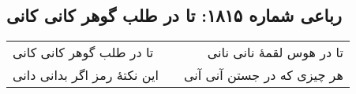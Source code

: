 \begin{center}
\section*{رباعی شماره ۱۸۱۵: تا در طلب گوهر کانی کانی}
\label{sec:1815}
\begin{longtable}{l p{0.5cm} r}
تا در طلب گوهر کانی کانی
&&
تا در هوس لقمهٔ نانی نانی
\\
این نکتهٔ رمز اگر بدانی دانی
&&
هر چیزی که در جستن آنی آنی
\\
\end{longtable}
\end{center}
